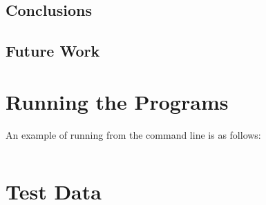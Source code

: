 \documentclass{l4proj}
\begin{document}
\section{Conclusions}

\section{Future Work}


\begin{appendices}

\chapter{Running the Programs}
An example of running from the command line is as follows:
\begin{verbatim}
\end{verbatim}

\chapter{Test Data}

\end{appendices}




\end{document}
